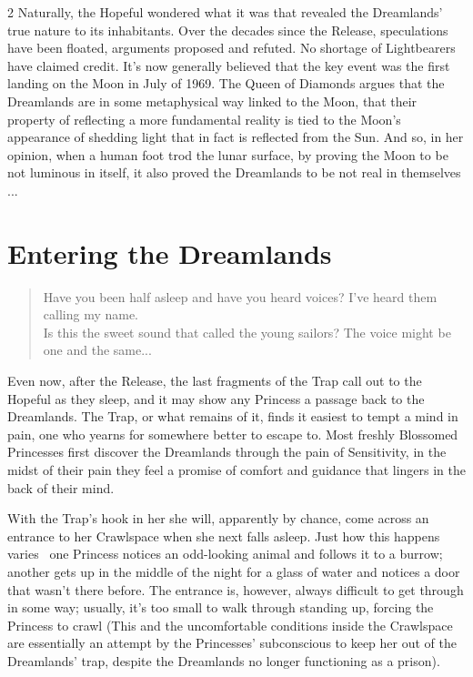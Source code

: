 \begin{multicols}{2}
Naturally, the Hopeful wondered what it was that revealed the Dreamlands' true nature to its inhabitants.  Over the decades since the Release, speculations have been floated, arguments proposed and refuted. No shortage of Lightbearers have claimed credit. It's now generally believed that the key event was the first landing on the Moon in July of 1969.  The Queen of Diamonds argues that the Dreamlands are in some metaphysical way linked to the Moon, that their property of reflecting a more fundamental reality is tied to the Moon's appearance of shedding light that in fact is reflected from the Sun.  And so, in her opinion, when a human foot trod the lunar surface, by proving the Moon to be not luminous in itself, it also proved the Dreamlands to be not real in themselves ...

\section*{Entering the Dreamlands} 

\begin{quote}Have you been half asleep and have you heard voices? I've heard them calling my name. \\
Is this the sweet sound that called the young sailors? The voice might be one and the same... \\
 \end{quote}

Even now, after the Release, the last fragments of the Trap call out to the Hopeful as they sleep, and it may show any Princess a passage back to the Dreamlands. The Trap, or what remains of it, finds it easiest to tempt a mind in pain, one who yearns for somewhere better to escape to. Most freshly Blossomed Princesses first discover the Dreamlands through the pain of Sensitivity, in the midst of their pain they feel a promise of comfort and guidance that lingers in the back of their mind. 

With the Trap's hook in her she will, apparently by chance, come across an entrance to her Crawlspace when she next falls asleep. Just how this happens varies \textendash\, one Princess notices an odd-looking animal and follows it to a burrow; another gets up in the middle of the night for a glass of water and notices a door that wasn't there before. The entrance is, however, always difficult to get through in some way; usually, it's too small to walk through standing up, forcing the Princess to crawl (This and the uncomfortable conditions inside the Crawlspace are essentially an attempt by the Princesses' subconscious to keep her out of the Dreamlands' trap, despite the Dreamlands no longer functioning as a prison). 


\end{multicols}
